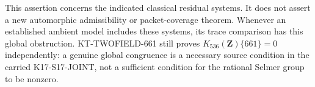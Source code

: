 This assertion concerns the indicated classical residual
systems. It does not assert a new automorphic admissibility
or packet-coverage theorem. Whenever an established ambient
model includes these systems, its trace comparison has
this global obstruction. KT-TWOFIELD-661 still proves
$K_{536}(\mathbf Z)\{661\}=0$ independently: a genuine
global congruence is a necessary source condition in
the carried K17-S17-JOINT, not a sufficient condition for the
rational Selmer group to be nonzero.

